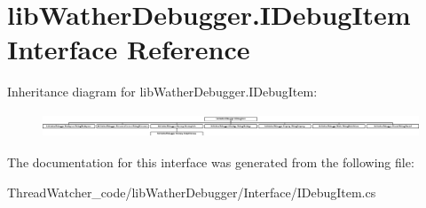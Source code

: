 \hypertarget{interfacelib_wather_debugger_1_1_i_debug_item}{\section{lib\+Wather\+Debugger.\+I\+Debug\+Item Interface Reference}
\label{interfacelib_wather_debugger_1_1_i_debug_item}
}
Inheritance diagram for lib\+Wather\+Debugger.\+I\+Debug\+Item\+:\begin{figure}[H]
\begin{center}
\leavevmode
\includegraphics[height=0.731707cm]{interfacelib_wather_debugger_1_1_i_debug_item}
\end{center}
\end{figure}


The documentation for this interface was generated from the following file\+:\begin{DoxyCompactItemize}
\item 
Thread\+Watcher\+\_\+code/lib\+Wather\+Debugger/\+Interface/I\+Debug\+Item.\+cs\end{DoxyCompactItemize}
